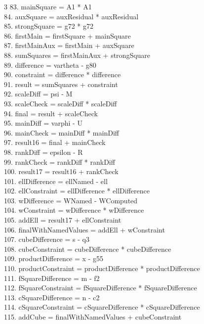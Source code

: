 \documentclass[10pt]{article}
\begin{document}
\begin{multicols}{3}
83. mainSquare = A1 * A1\\
84. auxSquare = auxResidual * auxResidual\\
85. strongSquare = g72 * g72\\
86. firstMain = firstSquare + mainSquare\\
87. firstMainAux = firstMain + auxSquare\\
88. sumSquares = firstMainAux + strongSquare\\
89. difference = vartheta - g80\\
90. constraint = difference * difference\\
91. result = sumSquares + constraint\\
92. scaleDiff = psi - M\\
93. scaleCheck = scaleDiff * scaleDiff\\
94. final = result + scaleCheck\\
95. mainDiff = varphi - U\\
96. mainCheck = mainDiff * mainDiff\\
97. result16 = final + mainCheck\\
98. rankDiff = epsilon - R\\
99. rankCheck = rankDiff * rankDiff\\
100. result17 = result16 + rankCheck\\
101. ellDifference = ellNamed - ell\\
102. ellConstraint = ellDifference * ellDifference\\
103. wDifference = WNamed - WComputed\\
104. wConstraint = wDifference * wDifference\\
105. addEll = result17 + ellConstraint\\
106. finalWithNamedValues = addEll + wConstraint\\
107. cubeDifference = s - q3\\
108. cubeConstraint = cubeDifference * cubeDifference\\
109. productDifference = x - g55\\
110. productConstraint = productDifference * productDifference\\
111. fSquareDifference = m - f2\\
112. fSquareConstraint = fSquareDifference * fSquareDifference\\
113. cSquareDifference = n - c2\\
114. cSquareConstraint = cSquareDifference * cSquareDifference\\
115. addCube = finalWithNamedValues + cubeConstraint\\

\end{multicols}
\end{document}
